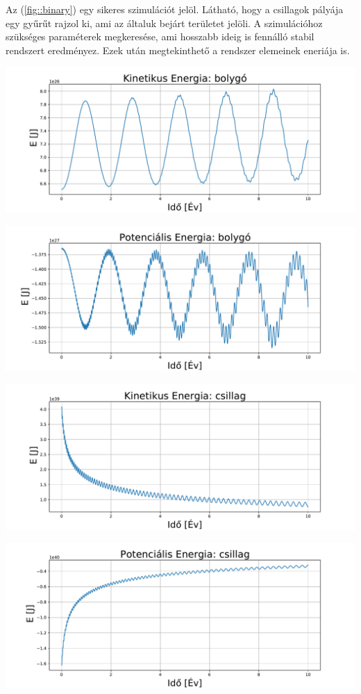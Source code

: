 Az (\ref{fig::binary}) egy sikeres szimulációt jelöl. Látható, hogy a csillagok pályája egy gyűrűt rajzol ki, ami az általuk bejárt területet jelöli. A szimulációhoz szükséges paraméterek megkeresése, ami hosszabb ideig is fennálló stabil rendszert eredményez. Ezek után megtekinthető a rendszer elemeinek eneriája is. 
\begin{center}
    \includegraphics[width=1.1\textwidth]{pics/test2_10BK.pdf}
\end{center}
\begin{center}
    \includegraphics[width=1.1\textwidth]{pics/test2_10BU.pdf}
\end{center}
\begin{center}
    \includegraphics[width=1.1\textwidth]{pics/test2_10CSK.pdf}
\end{center}
\begin{center}
    \includegraphics[width=1.1\textwidth]{pics/test2_10CSU.pdf}
\end{center}

